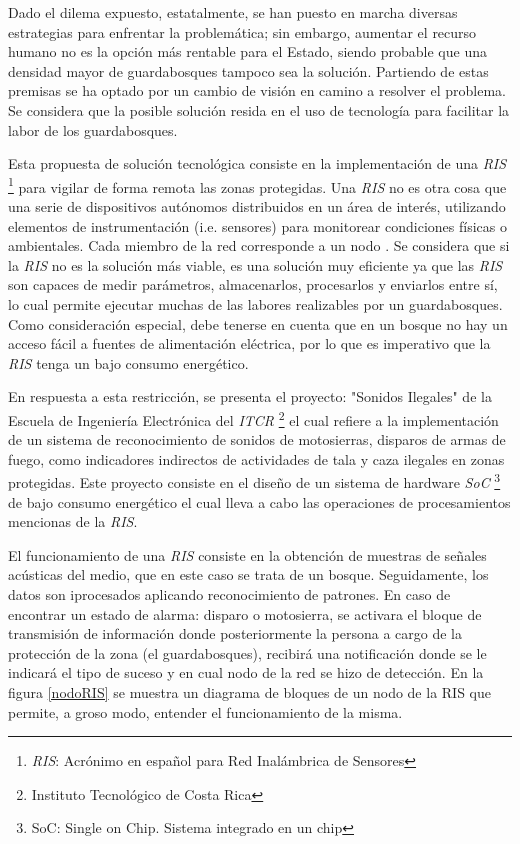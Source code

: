 Dado el dilema expuesto, estatalmente, se han puesto en marcha diversas estrategias para enfrentar la problemática; sin embargo, aumentar el recurso humano no es la opción más rentable para el Estado, siendo probable que una densidad mayor de guardabosques tampoco sea la solución. Partiendo de estas premisas se ha optado por un cambio de visión en camino a resolver el problema. Se considera que la posible solución resida en el uso de tecnología para facilitar la labor de los guardabosques.

Esta propuesta de solución tecnológica consiste en la implementación de una \textit{RIS} \footnote{\textit{RIS}: Acrónimo en español para Red Inalámbrica de Sensores} para vigilar de forma remota las zonas protegidas. Una \textit{RIS} no es otra cosa que una serie de dispositivos autónomos distribuidos en un área de interés, utilizando elementos de instrumentación (i.e. sensores) para monitorear condiciones físicas o ambientales. Cada miembro de la red corresponde a un nodo \cite{website:ni}. Se considera que si la \textit{RIS} no es la solución más viable, es una solución muy eficiente ya que las \textit{RIS} son capaces de medir parámetros, almacenarlos, procesarlos y enviarlos entre sí, lo cual permite ejecutar muchas de las labores realizables por un guardabosques. Como consideración especial, debe tenerse en cuenta que en un bosque no hay un acceso fácil a fuentes de alimentación eléctrica, por lo que es imperativo que la \textit{RIS} tenga un bajo consumo energético.

En respuesta a esta restricción, se presenta el proyecto: "Sonidos Ilegales" \cite{website:dcilab} de la Escuela de Ingeniería Electrónica del \textit{ITCR} \footnote{Instituto Tecnológico de Costa Rica} el cual refiere a la implementación de un sistema de reconocimiento de sonidos de motosierras, disparos de armas de fuego, como indicadores indirectos de actividades de tala y caza ilegales en zonas protegidas. Este proyecto consiste en el diseño de un sistema de hardware \textit{SoC} \footnote{SoC: Single on Chip. Sistema integrado en un chip} de bajo consumo energético el cual lleva a cabo las operaciones de procesamientos mencionas de la \textit{RIS}. \cite{website:inv_esc_electro, sirpa_SoC} 

El funcionamiento de una \textit{RIS} consiste en la obtención de muestras de señales
acústicas del medio, que en este caso se trata de un bosque. Seguidamente, los datos son iprocesados aplicando reconocimiento de patrones. En caso de encontrar un estado de alarma: disparo o motosierra, se activara el bloque de transmisión de información donde posteriormente la persona a cargo de la protección de la zona (el guardabosques), recibirá una notificación donde se le indicará el tipo de suceso y en cual nodo de la red se hizo de detección. En la figura \ref{nodoRIS} se muestra un diagrama de bloques de un nodo de la RIS que permite, a groso modo, entender el funcionamiento de la misma. \nocite{Carlosthesis}

